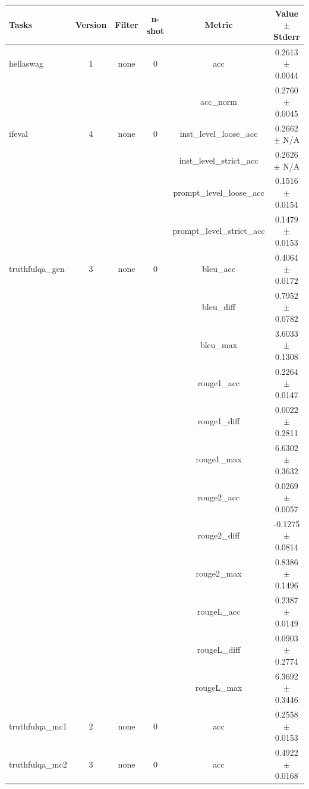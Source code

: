 \documentclass{ifacconf}
\begin{document}
\begin{strip}
\begin{minipage}{\textwidth}
			\begin{table}[H]
				\centering
				\begin{tabular}{|l|c|c|c|c|c|}
					\hline
					\textbf{Tasks} & \textbf{Version} & \textbf{Filter} & \textbf{n-shot} & \textbf{Metric} & \textbf{Value} $\pm$ \textbf{Stderr} \\ \hline
					hellaswag & 1 & none & 0 & acc & 0.2613 $\pm$ 0.0044 \\ \hline
					& & & & acc\_norm & 0.2760 $\pm$ 0.0045 \\ \hline
					ifeval & 4 & none & 0 & inst\_level\_loose\_acc & 0.2662 $\pm$ N/A \\ \hline
					& & & & inst\_level\_strict\_acc & 0.2626 $\pm$ N/A \\ \hline
					& & & & prompt\_level\_loose\_acc & 0.1516 $\pm$ 0.0154 \\ \hline
					& & & & prompt\_level\_strict\_acc & 0.1479 $\pm$ 0.0153 \\ \hline
					truthfulqa\_gen & 3 & none & 0 & bleu\_acc & 0.4064 $\pm$ 0.0172 \\ \hline
					& & & & bleu\_diff & 0.7952 $\pm$ 0.0782 \\ \hline
					& & & & bleu\_max & 3.6033 $\pm$ 0.1308 \\ \hline
					& & & & rouge1\_acc & 0.2264 $\pm$ 0.0147 \\ \hline
					& & & & rouge1\_diff & 0.0022 $\pm$ 0.2811 \\ \hline
					& & & & rouge1\_max & 6.6302 $\pm$ 0.3632 \\ \hline
					& & & & rouge2\_acc & 0.0269 $\pm$ 0.0057 \\ \hline
					& & & & rouge2\_diff & -0.1275 $\pm$ 0.0814 \\ \hline
					& & & & rouge2\_max & 0.8386 $\pm$ 0.1496 \\ \hline
					& & & & rougeL\_acc & 0.2387 $\pm$ 0.0149 \\ \hline
					& & & & rougeL\_diff & 0.0903 $\pm$ 0.2774 \\ \hline
					& & & & rougeL\_max & 6.3692 $\pm$ 0.3446 \\ \hline
					truthfulqa\_mc1 & 2 & none & 0 & acc & 0.2558 $\pm$ 0.0153 \\ \hline
					truthfulqa\_mc2 & 3 & none & 0 & acc & 0.4922 $\pm$ 0.0168 \\ \hline
				\end{tabular}
				\label{tab:qwen25_q4km}
			\end{table}
		\end{minipage}
	\end{strip}
	
\end{document}
